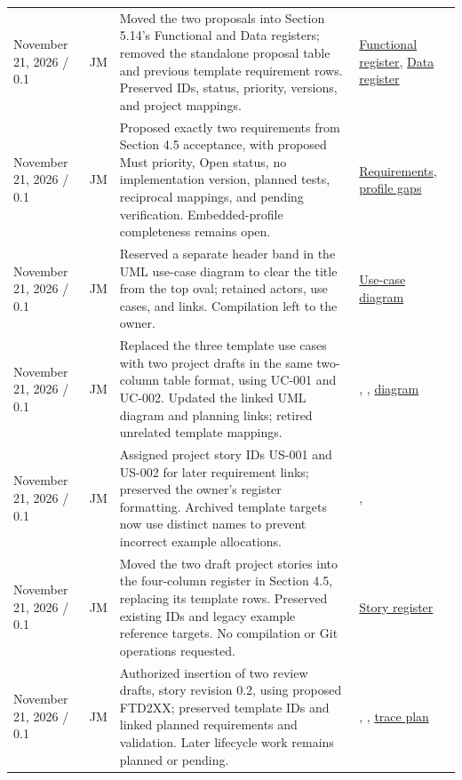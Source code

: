 \begin{tabularx}{\linewidth}{L{3.1cm}L{2.2cm}YL{2.0cm}}
November 21, 2026 / 0.1 & JM & Moved the two proposals into Section 5.14's Functional and Data registers; removed the standalone proposal table and previous template requirement rows. Preserved IDs, status, priority, versions, and project mappings. & \hyperref[Table:FunctionalRequirements]{Functional register}, \hyperref[Table:DataRequirements]{Data register}\\

November 21, 2026 / 0.1 & JM & Proposed exactly two requirements from Section 4.5 acceptance, with proposed Must priority, Open status, no implementation version, planned tests, reciprocal mappings, and pending verification. Embedded-profile completeness remains open. & \hyperref[Section:ProjectRequirements]{Requirements}, \hyperref[Table:ProjectProfileConcernCoverage]{profile gaps}\\

November 21, 2026 / 0.1 & JM & Reserved a separate header band in the UML use-case diagram to clear the title from the top oval; retained actors, use cases, and links. Compilation left to the owner. & \hyperref[Figure:UseCaseDiagram]{Use-case diagram}\\

November 21, 2026 / 0.1 & JM & Replaced the three template use cases with two project drafts in the same two-column table format, using UC-001 and UC-002. Updated the linked UML diagram and planning links; retired unrelated template mappings. & , , \hyperref[Figure:UseCaseDiagram]{diagram}\\

November 21, 2026 / 0.1 & JM & Assigned project story IDs US-001 and US-002 for later requirement links; preserved the owner's register formatting. Archived template targets now use distinct names to prevent incorrect example allocations. & , \\

November 21, 2026 / 0.1 & JM & Moved the two draft project stories into the four-column register in Section 4.5, replacing its template rows. Preserved existing IDs and legacy example reference targets. No compilation or Git operations requested. & \hyperref[Table:UserStories]{Story register}\\

November 21, 2026 / 0.1 & JM & Authorized insertion of two review drafts, story revision 0.2, using proposed FTD2XX; preserved template IDs and linked planned requirements and validation. Later lifecycle work remains planned or pending. & , , \hyperref[Section:DraftStoryTraceability]{trace plan}\\


\end{tabularx}

